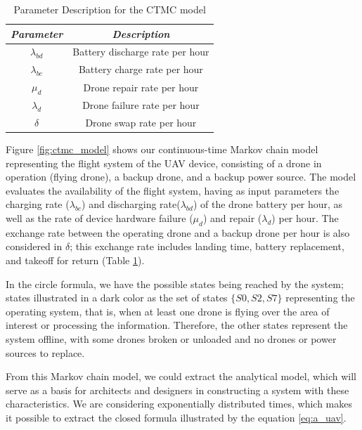 \documentclass[conference]{IEEEtran}
\begin{document}
\begin{table}[htbp]
\caption{Parameter Description for the CTMC model}
\begin{center}
\begin{tabular}{|c|c|}
\hline
\textbf{\textit{Parameter}}& \textbf{\textit{Description}} \\
\hline
  \(\lambda_{bd}\) & Battery discharge rate per hour \\
  \(\lambda_{bc}\)  & Battery charge rate per hour\\
 \(\mu_{d}\) & Drone repair rate per hour  \\
 \(\lambda_{d}\) & Drone failure rate per hour \\
 \(\delta\) & Drone swap rate per hour \\
\hline
\end{tabular}
\label{tab:ctmc_parameter_description}
\end{center}
\end{table}

Figure \ref{fig:ctmc_model} shows our continuous-time Markov chain model representing the flight system of the UAV device, consisting of a drone in operation (flying drone), a backup drone, and a backup power source. The model evaluates the availability of the flight system, having as input parameters the charging rate ($\lambda_{bc}$) and discharging rate($\lambda_{bd}$) of the drone battery per hour, as well as the rate of device hardware failure ($\mu_{d}$) and repair ($\lambda_{d}$) per hour. The exchange rate between the operating drone and a backup drone per hour is also considered in $\delta$; this exchange rate includes landing time, battery replacement, and takeoff for return (Table \ref{tab:ctmc_parameter_description}).

In the circle formula, we have the possible states being reached by the system; states illustrated in a dark color as the set of states $\{S0, S2, S7\}$ representing the operating system, that is, when at least one drone is flying over the area of interest or processing the information. Therefore, the other states represent the system offline, with some drones broken or unloaded and no drones or power sources to replace.

From this Markov chain model, we could extract the analytical model, which will serve as a basis for architects and designers in constructing a system with these characteristics. We are considering exponentially distributed times, which makes it possible to extract the closed formula illustrated by the equation \ref{eq:a_uav}.
\end{document}
